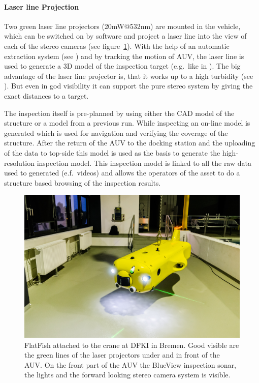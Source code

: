 \documentclass[conference]{IEEEtran}
\begin{document}
\paragraph*{\textbf{Laser line Projection}} Two green laser line projectors (20mW@532nm) 
are mounted in the vehicle, which can be switched on by software and project a laser line 
into the view of each of the stereo cameras (see figure~\ref{fig:flatfishlaser}). With the help 
of an automatic extraction system 
(see \cite{duda2013}) and by tracking the motion of AUV, the laser line is used to generate a 
3D model of the inspection target (e.g.~like in \cite{mcleod2013}). The big advantage of the 
laser line projector is, that it works up to a high turbidity (see \cite{albiez2015}). But even in 
god visibility it can support the pure stereo system by giving the exact distances to a target.

The inspection itself is pre-planned by using either the CAD model of the structure or a 
model from a previous run. While inspecting an on-line model is generated which is used for 
navigation and verifying the coverage of the structure. After the return of the AUV to the 
docking station and the uploading of the data to top-side this model is used as the basis to 
generate the high-resolution inspection model. This inspection model is linked to all the raw 
data used to generated (e.f.~videos) and allows the operators of the asset to do a structure 
based browsing of the inspection results.

\begin{figure}[!t]
	\centering
	\includegraphics[width=0.9\columnwidth]{FlatFish-3.jpg}
	\caption{FlatFish attached to the crane at DFKI in Bremen. Good visible are the green 
	lines of the laser projectors under and in front of the AUV. On the front part of the AUV the 
	BlueView inspection sonar, the lights and the forward looking stereo camera system is 
	visible.}
	\label{fig:flatfishlaser}
\end{figure}
\end{document}
